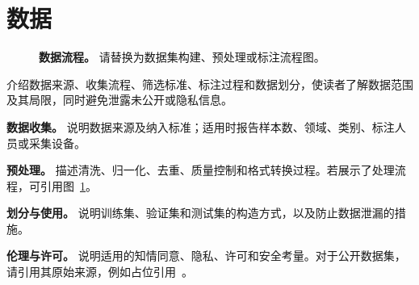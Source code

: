 \section{数据}
\label{sec:data}

\begin{figure}[t]
  \centering
  \caption{\textbf{数据流程。} 请替换为数据集构建、预处理或标注流程图。}
  \label{fig:data_pipeline}
\end{figure}

介绍数据来源、收集流程、筛选标准、标注过程和数据划分，使读者了解数据范围及其局限，同时避免泄露未公开或隐私信息。

\textbf{数据收集。} 说明数据来源及纳入标准；适用时报告样本数、领域、类别、标注人员或采集设备。

\textbf{预处理。} 描述清洗、归一化、去重、质量控制和格式转换过程。若展示了处理流程，可引用图~\ref{fig:data_pipeline}。

\textbf{划分与使用。} 说明训练集、验证集和测试集的构造方式，以及防止数据泄漏的措施。

\textbf{伦理与许可。} 说明适用的知情同意、隐私、许可和安全考量。对于公开数据集，请引用其原始来源，例如占位引用~\cite{sample_reference}。
